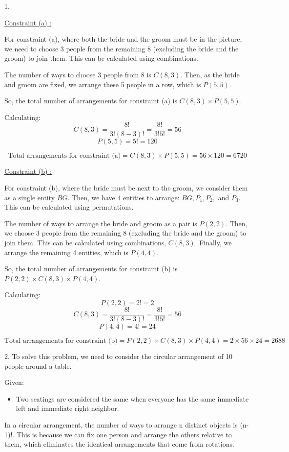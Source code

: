 \documentclass{article}
\begin{document}
1. 

\underline{Constraint (a) :}

For constraint (a), where both the bride and the groom must be in the picture, we need to choose 3 people from the remaining 8 (excluding the bride and the groom) to join them. This can be calculated using combinations.

The number of ways to choose 3 people from 8 is $ C(8, 3) $. Then, as the bride and groom are fixed, we arrange these 5 people in a row, which is $ P(5, 5) $.

So, the total number of arrangements for constraint (a) is $ C(8, 3) \times P(5, 5) $.

Calculating:
\[ C(8, 3) = \frac{8!}{3!(8-3)!} = \frac{8!}{3!5!} = 56 \]
\[ P(5, 5) = 5! = 120 \]

\[ \text{Total arrangements for constraint (a)} = C(8, 3) \times P(5, 5) = 56 \times 120 = 6720 \]

\underline{Constraint (b) :}

For constraint (b), where the bride must be next to the groom, we consider them as a single entity $ BG $. Then, we have 4 entities to arrange: $ BG, P_1, P_2, $ and $ P_3 $. This can be calculated using permutations.

The number of ways to arrange the bride and groom as a pair is $ P(2, 2) $. Then, we choose 3 people from the remaining 8 (excluding the bride and the groom) to join them. This can be calculated using combinations, $ C(8, 3) $. Finally, we arrange the remaining 4 entities, which is $ P(4, 4) $.

So, the total number of arrangements for constraint (b) is $ P(2, 2) \times C(8, 3) \times P(4, 4) $.

Calculating:
\[ P(2, 2) = 2! = 2 \]
\[ C(8, 3) = \frac{8!}{3!(8-3)!} = \frac{8!}{3!5!} = 56 \]
\[ P(4, 4) = 4! = 24 \]

\[ \text{Total arrangements for constraint (b)} = P(2, 2) \times C(8, 3) \times P(4, 4) = 2 \times 56 \times 24 = 2688 \]

2. To solve this problem, we need to consider the circular arrangement of 10 people around a table. 

Given:
\begin{itemize}
    \item Two seatings are considered the same when everyone has the same immediate left and immediate right neighbor.
\end{itemize}

In a circular arrangement, the number of ways to arrange n distinct objects is (n-1)!. This is because we can fix one person and arrange the others relative to them, which eliminates the identical arrangements that come from rotations.
\end{document}
